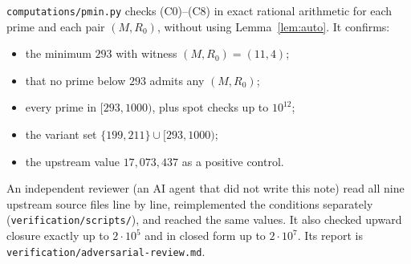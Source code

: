 \documentclass[11pt]{amsart}
\numberwithin{equation}{section}
\theoremstyle{definition}
\theoremstyle{remark}
\newcommand{\up}[1]{\texttt{#1}}
\begin{document}
\up{computations/pmin.py} checks (C0)--(C8) in exact rational
arithmetic for each prime and each pair $(M,R_0)$, without using
Lemma~\ref{lem:auto}. It confirms:
\begin{itemize}
\item the minimum $293$ with witness $(M,R_0)=(11,4)$;
\item that no prime below $293$ admits any $(M,R_0)$;
\item every prime in $[293,1000)$, plus spot checks up to $10^{12}$;
\item the variant set $\{199,211\}\cup[293,1000)$;
\item the upstream value $17{,}073{,}437$ as a positive control.
\end{itemize}
An independent reviewer (an AI agent that did not write this note)
read all nine upstream source files line by line, reimplemented the
conditions separately (\up{verification/scripts/}), and reached the
same values. It also checked upward closure exactly up to
$2\cdot10^5$ and in closed form up to $2\cdot10^7$. Its report is
\up{verification/adversarial-review.md}.

\printbibliography
\end{document}
